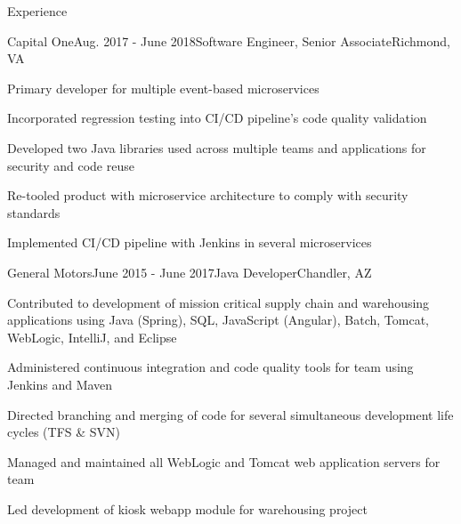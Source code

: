 \documentclass{resume} %
\begin{document}
\begin{rSection}{Experience}
	\begin{rSubsection}{Capital One}{Aug. 2017 - June 2018}{Software Engineer, Senior Associate}{Richmond, VA}
		\vspace{-0.5em}\setlength{\itemindent}{.0in}\item{
			Primary developer for multiple event-based microservices
		}
		\item Incorporated regression testing into CI/CD pipeline's code quality validation
		\item Developed two Java libraries used across multiple teams and applications for security and code reuse
		\item Re-tooled product with microservice architecture to comply with security standards
		\item Implemented CI/CD pipeline with Jenkins in several microservices

	\end{rSubsection}

	\begin{rSubsection}{General Motors}{June 2015 - June 2017}{Java Developer}{Chandler, AZ}
		\vspace{-0.5em}\setlength{\itemindent}{.0in}\item {
			Contributed to development of mission critical supply chain and warehousing applications using
			\newline
			Java (Spring), SQL, JavaScript (Angular), Batch, Tomcat, WebLogic, IntelliJ, and Eclipse
		}
		\item Administered continuous integration and code quality tools for team using Jenkins and Maven
		\item Directed branching and merging of code for several simultaneous development life cycles (TFS \& SVN)
		\item Managed and maintained all WebLogic and Tomcat web application servers for team
		\item Led development of kiosk webapp module for warehousing project
	
	\end{rSubsection}



\end{rSection}
\end{document}
